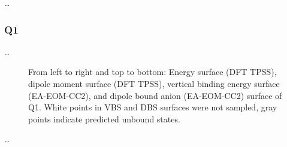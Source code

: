 \ldots
\subsubsection{Q1}

\ldots
\begin{figure}[ht!]
  \centering
  \small
  
  \label{fig:Q1_maps}
  \caption[Surfaces of Q1]{From left to right and top to bottom: Energy surface (DFT TPSS), dipole moment surface (DFT TPSS), vertical binding energy surface (EA-EOM-CC2), and dipole bound anion (EA-EOM-CC2) surface of Q1. White points in VBS and DBS surfaces were not sampled, gray points indicate predicted unbound states.}
\end{figure}
\iffalse\begin{figure}[ht!]
  \centering
  \begin{minipage}[]{0.49\textwidth}
    \centering
    \footnotesize
    
  \end{minipage}%
  \begin{minipage}[]{0.47\textwidth}
    \centering
    \small
    
  \end{minipage}
  \begin{minipage}[]{0.49\textwidth}
    \centering
    \small
    
  \end{minipage}%
  \begin{minipage}[]{0.47\textwidth}
    \centering
    \small
    
  \end{minipage}
  \label{fig:Q1_surf}
  \caption[Surfaces of Q1]{Surfaces of Q1. Left: Energy surface. Right: Dipole moment surface.}
\end{figure}\fi

\iffalse\begin{figure}[hb!]
  \centering
  \begin{minipage}[]{0.49\textwidth}
    \centering
    \small
    
  \end{minipage}%
  \begin{minipage}[]{0.47\textwidth}
    \centering
    \small
    
  \end{minipage}
  \label{fig:Q1_surf}
  \caption[Surfaces of Q1]{Surfaces of Q1. Left: Energy surface. Right: Dipole moment surface.}
\end{figure}
\subsection{A Simple Cluster Model}\fi
\ldots

